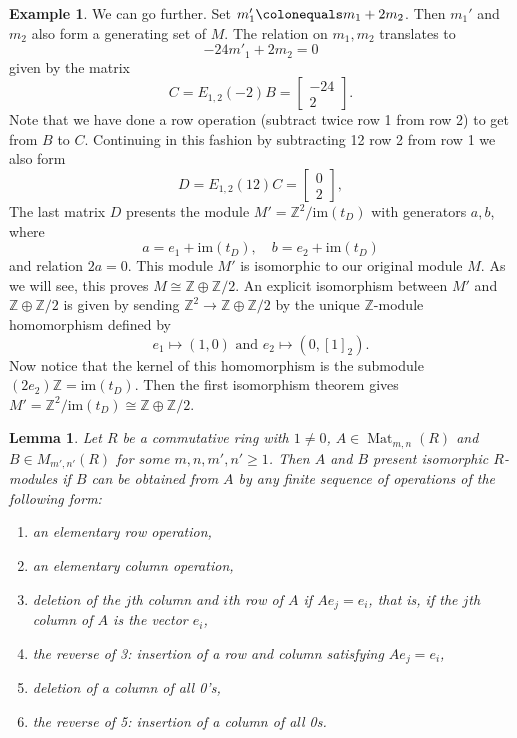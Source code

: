 \documentclass[12pt]{report}
\newtheorem{lemma}[theorem]{Lemma}
\numberwithin{equation}{section}
\numberwithin{theorem}{chapter}
\theoremstyle{definition}
\newtheorem{example}[theorem]{Example}
\newtheorem*{basic properties}{Basic Properties}
\newtheorem*{Important Remark}{Important Remark}
\DeclareMathOperator{\M}{Mat}
\begin{document}
\begin{example}
We can go further. Set $m_1' \colonequals m_1 + 2m_2$. Then $m_1'$ and $m_2$ also form a generating set of $M$. The relation on $m_1, m_2$ translates to
$$
-24m'_1  +2 m_2 = 0
$$
given by the matrix
$$
C = E_{1,2}(-2)B=
\begin{bmatrix} -24 \\ 2
\end{bmatrix}.
$$
Note that we have done a row operation (subtract twice row 1 from row 2) to get from $B$ to $C$.
Continuing in this fashion by subtracting 12 row 2 from row 1 we also form 
$$
D = E_{1,2}(12)C=
\begin{bmatrix} 0 \\ 2
\end{bmatrix},
$$
The last matrix $D$ presents the module $M'=\mathbb{Z}^2/\mathrm{im}(t_D)$ with generators $a, b$, where
$$a=e_1+\mathrm{im}(t_D), \quad b=e_2+\mathrm{im}(t_D)$$ 
and relation $2a = 0$. This module $M'$ is isomorphic to our original module $M$. As we will see, this proves $M \cong \mathbb{Z} \oplus \mathbb{Z}/2$. An explicit isomorphism between $M'$ and $\mathbb{Z} \oplus \mathbb{Z}/2$ is given by sending $\mathbb{Z}^2\to \mathbb{Z} \oplus \mathbb{Z}/2$ by the unique $\mathbb{Z}$-module homomorphism defined by 
$$e_1\mapsto (1,0) \textrm{ and } e_2\mapsto (0,[1]_2).$$ 
Now notice that the kernel of this homomorphism is the submodule $(2e_2)\mathbb{Z}=\mathrm{im}(t_D)$. Then the first isomorphism theorem gives
$M'=\mathbb{Z}^2/\mathrm{im}(t_D)\cong \mathbb{Z} \oplus \mathbb{Z}/2$.
\end{example}




\begin{lemma} 
Let $R$ be a commutative ring with $1 \neq 0$, $A \in \M_{m,n}(R)$ and $B \in M_{m',n'}(R)$ for some $m,n,m',n' \geqslant 1$. Then $A$ and $B$ present isomorphic $R$-modules if $B$ can be obtained from $A$ by any finite sequence of operations of the following form: 
\begin{enumerate}[label=(\arabic*),leftmargin=20pt]
\item an elementary row operation, 
\item an elementary column operation,
\item deletion of the $j$th column and $i$th row of $A$ if $Ae_j = e_i$, that is, if the $j$th column of $A$ is the vector $e_i$, 
\item the reverse of 3: insertion of a row and column satisfying $Ae_j = e_i$, 
\item deletion of a column of all 0's, 
\item the reverse of 5: insertion of a column of all 0s.
 \end{enumerate}
 \end{lemma}
 
\end{document}
